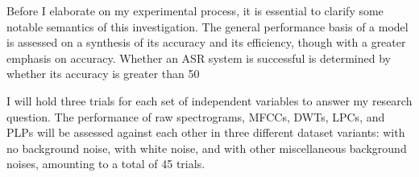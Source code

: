 Before I elaborate on my experimental process, it is essential to clarify some notable semantics of this investigation. The general performance basis of a model is assessed on a synthesis of its accuracy and its efficiency, though with a greater emphasis on accuracy. Whether an ASR system is successful is determined by whether its accuracy is greater than 50%
\par
I will hold three trials for each set of independent variables to answer my research question. The performance of raw spectrograms, MFCCs, DWTs, LPCs, and PLPs will be assessed against each other in three different dataset variants: with no background noise, with white noise, and with other miscellaneous background noises, amounting to a total of 45 trials. 